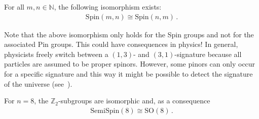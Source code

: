    \begin{property}
        For all $m,n\in\mathbb{N}$, the following isomorphism exists:
        \begin{gather}
            \mathrm{Spin}(m,n)\cong\mathrm{Spin}(n,m)\,.
        \end{gather}
    \end{property}
    \begin{remark}
        Note that the above isomorphism only holds for the Spin groups and not for the associated Pin groups. This could have consequences in physics! In general, physicists freely switch between a $(1,3)$- and $(3,1)$-signature because all particles are assumed to be proper spinors. However, some pinors can only occur for a specific signature and this way it might be possible to detect the signature of the universe (see~\cite{berg_pin_2001}).
    \end{remark}

    \begin{property}
        For $n=8$, the $\mathbb{Z}_2$-subgroups are isomorphic and, as a consequence \begin{gather}
            \mathrm{SemiSpin}(8)\cong\mathrm{SO}(8)\,.
        \end{gather}
    \end{property}